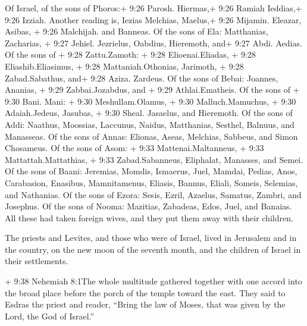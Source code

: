  Of Israel, of the sons of Phoros:+ 9:26 Parosh. Hiermas,+
9:26 Ramiah Ieddias,+ 9:26 Izziah. Another reading is, Iezias Melchias,
Maelus,+ 9:26 Mijamin. Eleazar, Asibas, + 9:26 Malchijah. and Banneas.
 Of the sons of Ela: Matthanias, Zacharias, + 9:27 Jehiel.
Jezrielus, Oabdius, Hieremoth, and+ 9:27 Abdi. Aedias.  Of
the sons of + 9:28 Zattu.Zamoth: + 9:28 Elioenai.Eliadas, + 9:28
Eliashib.Eliasimus, + 9:28 Mattaniah.Othonias, Jarimoth, + 9:28
Zabad.Sabathus, and+ 9:28 Aziza. Zardeus.  Of the sons of
Bebai: Joannes, Ananias, + 9:29 Zabbai.Jozabdus, and + 9:29
Athlai.Ematheis.  Of the sons of + 9:30 Bani. Mani: + 9:30
Meshullam.Olamus, + 9:30 Malluch.Mamuchus, + 9:30 Adaiah.Jedeus,
Jasubas, + 9:30 Sheal. Jasaelus, and Hieremoth.  Of the
sons of Addi: Naathus, Moossias, Laccunus, Naidus, Matthanias, Sesthel,
Balnuus, and Manasseas.  Of the sons of Annas: Elionas,
Aseas, Melchias, Sabbeus, and Simon Chosameus.  Of the sons
of Asom: + 9:33 Mattenai.Maltanneus, + 9:33 Mattattah.Mattathias, + 9:33
Zabad.Sabanneus, Eliphalat, Manasses, and Semei.  Of the
sons of Baani: Jeremias, Momdis, Ismaerus, Juel, Mamdai, Pedias, Anos,
Carabasion, Enasibus, Mamnitamenus, Eliasis, Bannus, Eliali, Someis,
Selemias, and Nathanias. Of the sons of Ezora: Sesis, Ezril, Azaelus,
Samatus, Zambri, and Josephus.  Of the sons of Nooma:
Mazitias, Zabadeas, Edos, Juel, and Banaias.  All these had
taken foreign wives, and they put them away with their children.

 The priests and Levites, and those who were of Israel,
lived in Jerusalem and in the country, on the new moon of the seventh
month, and the children of Israel in their settlements.

 + 9:38 Nehemiah 8:1The whole multitude gathered together
with one accord into the broad place before the porch of the temple
toward the east.  They said to Esdras the priest and
reader, ``Bring the law of Moses, that was given by the Lord, the God of
Israel.''

